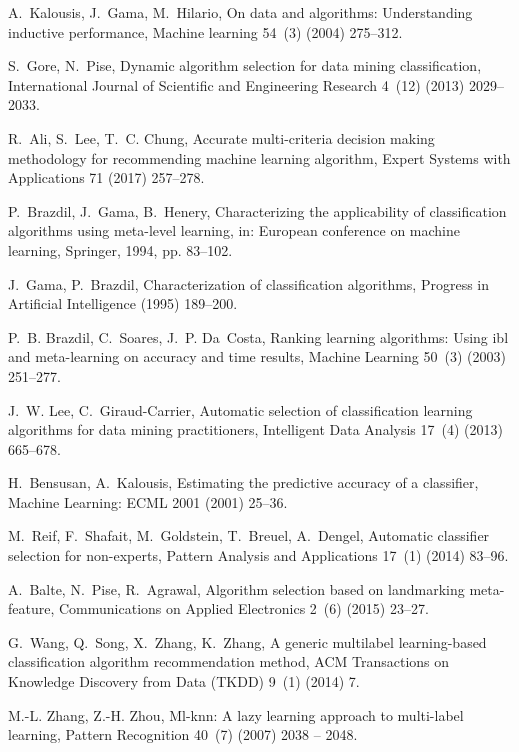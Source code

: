 \documentclass[review,3p,twocolumn,times]{elsarticle}
\begin{document}
\begin{thebibliography}{10}
	A.~Kalousis, J.~Gama, M.~Hilario, On data and algorithms: Understanding
	inductive performance, Machine learning 54~(3) (2004) 275--312.
	
	S.~Gore, N.~Pise, Dynamic algorithm selection for data mining classification,
	International Journal of Scientific and Engineering Research 4~(12) (2013)
	2029--2033.
	
	R.~Ali, S.~Lee, T.~C. Chung, Accurate multi-criteria decision making
	methodology for recommending machine learning algorithm, Expert Systems with
	Applications 71 (2017) 257--278.
	
	P.~Brazdil, J.~Gama, B.~Henery, Characterizing the applicability of
	classification algorithms using meta-level learning, in: European conference
	on machine learning, Springer, 1994, pp. 83--102.
	
	J.~Gama, P.~Brazdil, Characterization of classification algorithms, Progress in
	Artificial Intelligence (1995) 189--200.
	
	P.~B. Brazdil, C.~Soares, J.~P. Da~Costa, Ranking learning algorithms: Using
	ibl and meta-learning on accuracy and time results, Machine Learning 50~(3)
	(2003) 251--277.
	
	J.~W. Lee, C.~Giraud-Carrier, Automatic selection of classification learning
	algorithms for data mining practitioners, Intelligent Data Analysis 17~(4)
	(2013) 665--678.
	
	H.~Bensusan, A.~Kalousis, Estimating the predictive accuracy of a classifier,
	Machine Learning: ECML 2001 (2001) 25--36.
	
	M.~Reif, F.~Shafait, M.~Goldstein, T.~Breuel, A.~Dengel, Automatic classifier
	selection for non-experts, Pattern Analysis and Applications 17~(1) (2014)
	83--96.
	
	A.~Balte, N.~Pise, R.~Agrawal, Algorithm selection based on landmarking
	meta-feature, Communications on Applied Electronics 2~(6) (2015) 23--27.
	
	G.~Wang, Q.~Song, X.~Zhang, K.~Zhang, A generic multilabel learning-based
	classification algorithm recommendation method, ACM Transactions on Knowledge
	Discovery from Data (TKDD) 9~(1) (2014) 7.
	
	M.-L. Zhang, Z.-H. Zhou, Ml-knn: A lazy learning approach to multi-label
	learning, Pattern Recognition 40~(7) (2007) 2038 -- 2048.
	

\end{thebibliography}
\end{document}
